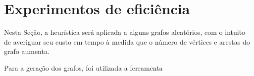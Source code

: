 \section{Experimentos de eficiência}
\label{sec:experimentos-eficiencia}
Nesta Seção, a heurística será aplicada a alguns grafos aleatórios,
com o intuito de averiguar seu custo em tempo à medida que o número de
vértices e arestas do grafo aumenta.

Para a geração dos grafos, foi utilizada a ferramenta
